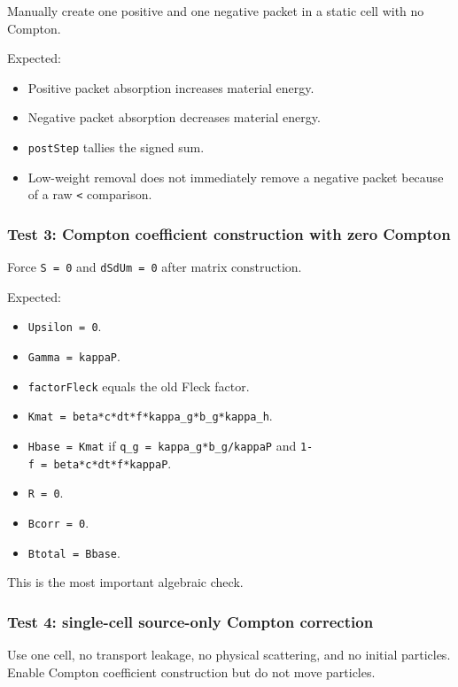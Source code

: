 \documentclass[
]{article}
\providecommand{\tightlist}{%
  \setlength{\itemsep}{0pt}\setlength{\parskip}{0pt}}
\begin{document}
Manually create one positive and one negative packet in a static cell
with no Compton.

Expected:

\begin{itemize}
\tightlist
\item
  Positive packet absorption increases material energy.
\item
  Negative packet absorption decreases material energy.
\item
  \texttt{postStep} tallies the signed sum.
\item
  Low-weight removal does not immediately remove a negative packet
  because of a raw \texttt{\textless{}} comparison.
\end{itemize}

\subsubsection{Test 3: Compton coefficient construction with zero
Compton}\label{test-3-compton-coefficient-construction-with-zero-compton}

Force \texttt{S\ =\ 0} and \texttt{dSdUm\ =\ 0} after matrix
construction.

Expected:

\begin{itemize}
\tightlist
\item
  \texttt{Upsilon\ =\ 0}.
\item
  \texttt{Gamma\ =\ kappaP}.
\item
  \texttt{factorFleck} equals the old Fleck factor.
\item
  \texttt{Kmat\ =\ beta*c*dt*f*kappa\_g*b\_g*kappa\_h}.
\item
  \texttt{Hbase\ =\ Kmat} if \texttt{q\_g\ =\ kappa\_g*b\_g/kappaP} and
  \texttt{1-f\ =\ beta*c*dt*f*kappaP}.
\item
  \texttt{R\ =\ 0}.
\item
  \texttt{Bcorr\ =\ 0}.
\item
  \texttt{Btotal\ =\ Bbase}.
\end{itemize}

This is the most important algebraic check.

\subsubsection{Test 4: single-cell source-only Compton
correction}\label{test-4-single-cell-source-only-compton-correction}

Use one cell, no transport leakage, no physical scattering, and no
initial particles. Enable Compton coefficient construction but do not
move particles.
\end{document}
